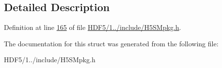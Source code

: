 \subsection{Detailed Description}


Definition at line \hyperlink{_h_d_f5_21_810_81_2include_2_h5_s_mpkg_8h_source_l00165}{165} of file \hyperlink{_h_d_f5_21_810_81_2include_2_h5_s_mpkg_8h_source}{H\+D\+F5/1../include/\+H5\+S\+Mpkg.\+h}.



The documentation for this struct was generated from the following file\+:\begin{DoxyCompactItemize}
\item 
H\+D\+F5/1../include/\+H5\+S\+Mpkg.\+h\end{DoxyCompactItemize}
